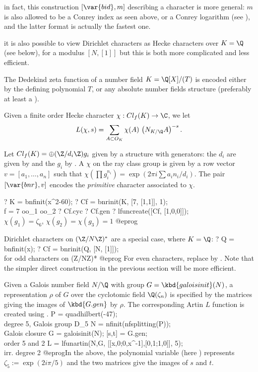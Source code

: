 \item in fact, this construction $[\var{bid}, m]$ describing a character
is more general: $m$ is also allowed to be a Conrey index as seen above,
or a Conrey logarithm (see ), and the latter format is
actually the fastest one.

\item it is also possible to view Dirichlet characters as Hecke characters
over $K = \Q$ (see below), for a modulus $[N, [1]]$ but this is both more
complicated and less efficient.


The Dedekind zeta function of a number field $K = \Q[X]/(T)$ is encoded
either by the defining polynomial $T$, or any absolute number fields
structure (preferably at least a ).

Given a finite order Hecke character $\chi: Cl_f(K)\to \C$, we let
$$L(\chi, s) = \sum_{A \subset O_K} \chi(A)\, \left(N_{K/\Q}A\right)^{-s}.$$

Let $Cl_f(K) = \oplus (\Z/d_i\Z) g_i$ given by a  structure with
generators: the $d_i$ are given by  and the $g_i$ by .
A  $\chi$ on the ray class group is given by a row vector
$v = [a_1,\ldots,a_n]$ such that $\chi(\prod g_i^{n_i}) = \exp(2\pi i\sum
a_i n_i / d_i)$. The pair $[\var{bnr}, v]$ encodes the \emph{primitive}
character associated to $\chi$.

\bprog
? K  = bnfinit(x^2-60);
? Cf = bnrinit(K, [7, [1,1]], 1); \\ f = 7 oo_1 oo_2
? Cf.cyc
? Cf.gen
? lfuncreate([Cf, [1,0,0]]); \\$\chi(g_1) = \zeta_6$, $\chi(g_2)=\chi(g_3)=1$
@eprog

\noindent Dirichlet characters on $(\Z/N\Z)^*$ are a special case,
where $K = \Q$:
\bprog
? Q  = bnfinit(x);
? Cf = bnrinit(Q, [N, [1]]); \\ for odd characters on (Z/NZ)*
@eprog\noindent
For even characters, replace by . Note that the simpler
direct construction in the previous section will be more efficient.


Given a Galois number field $N/\Q$ with group $G = \kbd{galoisinit}(N)$,
a representation $\rho$ of $G$ over the cyclotomic field $\Q(\zeta_n)$
is specified by the matrices giving the images of $\kbd{G.gen}$ by $\rho$.
The corresponding Artin $L$ function is created using .
\bprog
   P = quadhilbert(-47); \\  degree 5, Galois group D_5
   N = nfinit(nfsplitting(P)); \\ Galois closure
   G = galoisinit(N);
   [s,t] = G.gen; \\ order 5 and 2
   L = lfunartin(N,G, [[x,0;0,x^-1],[0,1;1,0]], 5); \\ irr. degree 2
@eprog\noindent In the above, the polynomial variable (here ) represents
$\zeta_5 := \exp(2i\pi/5)$ and the two matrices give the images of
$s$ and $t$.

